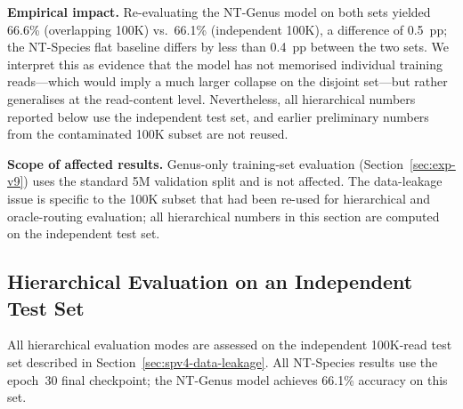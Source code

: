 \textbf{Empirical impact.}
Re-evaluating the NT-Genus model on both sets yielded 66.6\% (overlapping 100K) vs.\ 66.1\% (independent 100K), a difference of 0.5~pp; the NT-Species flat baseline differs by less than 0.4~pp between the two sets.
We interpret this as evidence that the model has not memorised individual training reads---which would imply a much larger collapse on the disjoint set---but rather generalises at the read-content level.
Nevertheless, all hierarchical numbers reported below use the independent test set, and earlier preliminary numbers from the contaminated 100K subset are not reused.

\textbf{Scope of affected results.}
Genus-only training-set evaluation (Section~\ref{sec:exp-v9}) uses the standard 5M validation split and is not affected.
The data-leakage issue is specific to the 100K subset that had been re-used for hierarchical and oracle-routing evaluation; all hierarchical numbers in this section are computed on the independent test set.

\subsection{Hierarchical Evaluation on an Independent Test Set}
\label{sec:spv4-hierarchical-prelim}

All hierarchical evaluation modes are assessed on the independent 100K-read test set described in Section~\ref{sec:spv4-data-leakage}.
All NT-Species results use the epoch~30 final checkpoint; the NT-Genus model achieves 66.1\% accuracy on this set.

